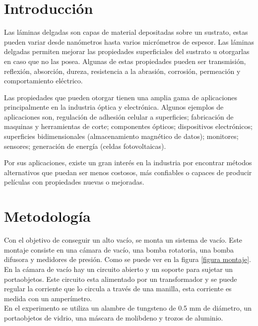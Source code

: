 \documentclass[journal]{IEEEtran}
\begin{document}
\section{Introducción}

Las láminas delgadas son capas de material depositadas sobre un sustrato, estas pueden variar desde nanómetros hasta varios micrómetros de espesor. Las láminas delgadas permiten mejorar las propiedades superficiales del sustrato u otorgarlas en caso que no las posea. Algunas de estas propiedades pueden ser transmisión, reflexión, absorción, dureza, resistencia a la abrasión, corrosión, permeación y comportamiento eléctrico. 

Las propiedades que pueden otorgar tienen una amplia gama de aplicaciones principalmente en la industria óptica y electrónica. Algunos ejemplos de aplicaciones son, regulación de adhesión celular a superficies; fabricación de maquinas y herramientas de corte; componentes ópticos; dispositivos electrónicos; superficies bidimensionales (almacenamiento magnético de datos); monitores; sensores; generación de energía (celdas fotovoltaicas). 

Por sus aplicaciones, existe un gran interés en la industria por encontrar métodos alternativos que puedan ser menos costosos, más confiables o capaces de producir películas con propiedades nuevas o mejoradas.

\section{Metodología}	

Con el objetivo de conseguir un alto vacío, se monta un sistema de vacío. 
Este montaje consiste en una cámara de vacío, una bomba rotatoria, una bomba difusora y medidores de presión.  Como se puede ver en la figura \ref{figura montaje}.  \\

En la cámara de vacío hay un circuito abierto y un soporte para sujetar un portaobjetos. Este circuito esta alimentado por un transformador y se puede regular la corriente que lo circula a través de una manilla, esta corriente es medida con un amperímetro. \\ 

En el experimento se utiliza un alambre de tungsteno de 0.5 mm de diámetro, un portaobjetos de vidrio, una máscara de molibdeno y trozos de aluminio.\\
\end{document}
